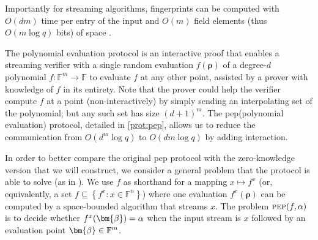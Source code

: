 \documentclass[a4paper,UKenglish,cleveref, autoref, thm-restate]{lipics-v2021}
\theoremstyle{definition}
\newcommand{\field}{\mathbb{F}}
\renewcommand{\set}[1]{\left\{#1\right\}}
\newcommand{\pep}{\normalfont\textsc{pep}\xspace}
\newcommand{\pepprotocol}{\textsf{pep}\xspace}
\newcommand{\dimension}{m}
\newcommand{\degree}{d}
\newcommand{\fieldsize}{q}
\newcommand{\evaluationpoint}{\bm{\fe2}}
\newcommand{\fingerprinttuple}{\bm{\rho}}
\def\fe#1{
    \ifnum#1=1
        \alpha
    \else
    \ifnum#1=2
        \beta
    \else
    \ifnum#1=3
        \gamma
    \fi\fi\fi
}
\begin{document}
Importantly for streaming algorithms, fingerprints can be computed with $O(\degree \dimension)$ time per entry of the input and $O(\dimension)$ field elements (thus $O(\dimension \log \fieldsize)$ bits) of space \cite{CTY11}.

The polynomial evaluation protocol is an interactive proof that enables a streaming verifier with a single random evaluation $f(\fingerprinttuple)$ of a degree-$\degree$ polynomial $f:\field^\dimension\to\field$ to evaluate $f$ at any other point, assisted by a prover with knowledge of $f$ in its entirety. Note that the prover could help the verifier compute $f$ at a point (non-interactively) by simply sending an interpolating set of the polynomial; but any such set has size $(\degree + 1)^\dimension$. The \pepprotocol (polynomial evaluation) protocol, detailed in \cref{prot:pep}, allows us to reduce the communication from $O(\degree^\dimension\log \fieldsize)$ to $O(\degree \dimension \log \fieldsize)$ by adding interaction.

In order to better compare the original \pepprotocol protocol with the zero-knowledge version that we will construct, we consider a general problem that the protocol is able to solve (as in \cite{CCMTV19}). We use $f$ as shorthand for a mapping $x \mapsto f^x$ (or, equivalently, a set $f \subseteq \set{f^x : x \in \field^n}$) where one evaluation $f^x(\fingerprinttuple)$ can be computed by a space-bounded algorithm that streams $x$. The problem $\pep(f, \fe1)$ is to decide whether $f^x(\evaluationpoint) = \fe1$ when the input stream is $x$ followed by an evaluation point $\evaluationpoint \in \field^\dimension$.
\end{document}
